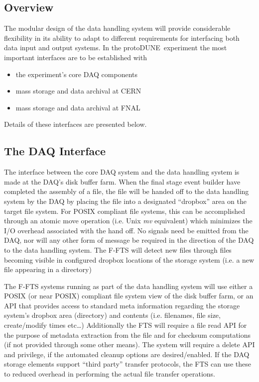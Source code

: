 \documentclass[pdftex,12pt,letter]{article}
\newcommand{\pd}{protoDUNE\ }
\begin{document}
\subsection{Overview}
The modular design of the data handling system will provide considerable flexibility in its ability to adapt to different requirements
for interfacing  both data input and output systems.  In the \pd experiment the most important interfaces are to be established with
\begin{itemize}
\item the experiment’s core DAQ components
\item mass storage and data archival at CERN
\item mass storage and data archival at FNAL
\end{itemize}

\noindent
 Details of these interfaces are presented below.

\subsection{The DAQ Interface}
The interface between the core DAQ system and the data handling system is made at the DAQ’s disk buffer farm.
When the final stage event builder have completed the assembly of a file, the file will be handed off to the data handling system
by the DAQ by placing the file into a designated ``dropbox'' area on the target file system.  For POSIX compliant file systems,
this can be accomplished through an atomic move operation (i.e. Unix \textit{mv} equivalent) which minimizes the I/O overhead associated
with the hand off.  No signals need be emitted from the DAQ, nor will any other form of message be required in the direction of the
DAQ to the data handling system.  The F-FTS will detect new files through files becoming visible in configured dropbox locations of
the storage system (i.e. a new file appearing in a directory) 

The F-FTS systems running as part of the data handling system will use either a POSIX (or near POSIX) compliant file system view of the disk buffer farm,
or an API that provides access to standard meta information regarding the storage system’s dropbox area (directory) and contents
(i.e. filenames, file size, create/modify times etc…)  Additionally the FTS will require a file read API for the purpose of metadata
extraction from the file and for checksum computations (if not provided through some other means).  The system will require a
delete API and privilege, if the automated cleanup options are desired/enabled.  If the DAQ storage elements support ``third party''
transfer protocols, the FTS can use these to reduced overhead in performing the actual file transfer operations.
\end{document}
